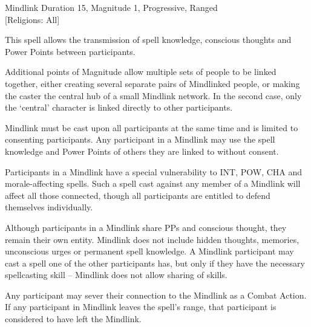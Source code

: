 \begin{rpg-spell}
{Mindlink}
{Duration 15, Magnitude 1, Progressive, Ranged\\{[Religions: All]}}

This spell allows the transmission of spell knowledge, conscious thoughts and Power Points between participants. 

Additional points of Magnitude allow multiple sets of people to be linked together, either creating several separate pairs of Mindlinked people, or making the caster the central hub of a small Mindlink network. In the second case, only the ‘central’ character is linked directly to other participants. 

Mindlink must be cast upon all participants at the same time and is limited to consenting participants. Any participant in a Mindlink may use the spell knowledge and Power Points of others they are linked to without consent. 

Participants in a Mindlink have a special vulnerability to INT, POW, CHA and morale-affecting spells. Such a spell cast against any member of a Mindlink will affect all those connected, though all participants are entitled to defend themselves individually. 

Although participants in a Mindlink share PPs and conscious thought, they remain their own entity. Mindlink does not include hidden thoughts, memories, unconscious urges or permanent spell knowledge. A Mindlink participant may cast a spell one of the other participants has, but only if they have the necessary spellcasting skill – Mindlink does not allow sharing of skills. 

Any participant may sever their connection to the Mindlink as a Combat Action. If any participant in Mindlink leaves the spell’s range, that participant is considered to have left the Mindlink. 
\end{rpg-spell}

